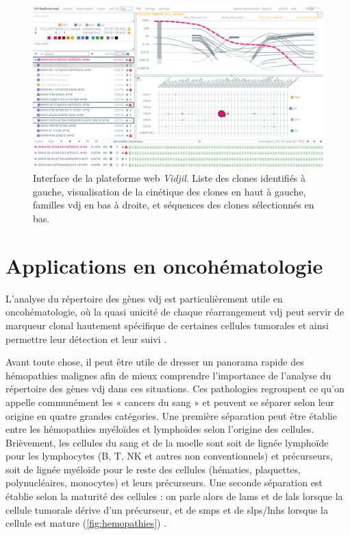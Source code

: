 \begin{figure}[H]
    \centering
    \includegraphics[width=1\textwidth]{images/vidjil-web.png}
    \caption{Interface de la plateforme web \textit{Vidjil}. 
    Liste des clones identifiés à gauche, visualisation de la cinétique des clones en haut à gauche, 
    familles \gls{vdj} en bas à droite, et séquences des clones sélectionnés en bas.}
    \label{fig:vidjil-web}
\end{figure}

\section{Applications en oncohématologie}

L'analyse du répertoire des gènes \gls{vdj} est particulièrement utile en oncohématologie, 
où la quasi unicité de chaque réarrangement \gls{vdj} peut servir de marqueur clonal hautement 
spécifique de certaines cellules tumorales et ainsi permettre leur détection et leur suivi \cite{hultcrantzBaselineVDJClonotype2020}.

\vspace{1em}
 
Avant toute chose, il peut être utile de dresser un panorama rapide des hémopathies malignes afin de 
mieux comprendre l'importance de l'analyse du répertoire des gènes \gls{vdj} dans ces situations.  
Ces pathologies regroupent ce qu'on appelle communément les « cancers du sang » et peuvent se séparer selon
leur origine en quatre grandes catégories. Une première séparation peut être établie entre les hémopathies 
myéloïdes et lymphoïdes selon l'origine des cellules. Brièvement, les cellules du sang et de la moelle sont soit de 
lignée lymphoïde pour les lymphocytes (B, T, NK et autres non conventionnels) et précurseurs, soit de lignée myéloïde 
pour le reste des cellules (hématies, plaquettes, polynucléaires, monocytes) et leurs précurseurs. Une seconde séparation 
est établie selon la maturité des cellules : on parle alors de \glspl{lam} et de \glspl{lal} lorsque la cellule 
tumorale dérive d'un précurseur, et de \glspl{smp} et de \glspl{slp}/\glspl{lnh} lorsque la cellule est mature (\autoref{fig:hemopathies}) 
\cite{alaggio5thEditionWorld2022a, khoury5thEditionWorld2022}.

